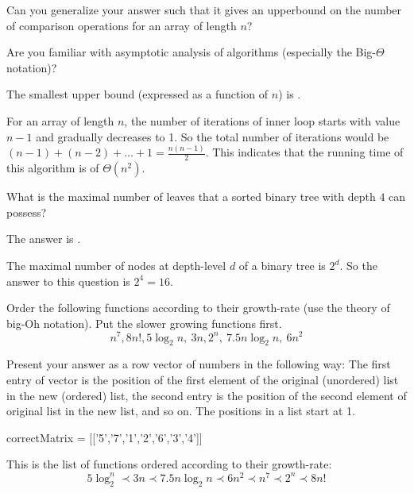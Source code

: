 \documentclass{ximera}
\begin{document}
\begin{question}
Can you generalize your answer such that it gives an upperbound on the
number of comparison operations for an array of length $n$?
\begin{solution}
\begin{hint}
Are you familiar with asymptotic analysis of algorithms (especially
the Big-$\Theta$ notation)?
\end{hint}
The smallest upper bound (expressed as a function of $n$) is
.
\end{solution}
For an array of length $n$, the number of iterations of inner loop
starts with value $n-1$ and gradually decreases to 1. So the total
number of iterations would be $(n-1) + (n-2) + \ldots + 1 =
\frac{n(n-1)}{2}$. This indicates that the running time of this
algorithm is of $\Theta(n^2)$.
\end{question}

\begin{question}
What is the maximal number of leaves that a sorted binary tree with depth $4$ can possess?
\begin{solution}
The answer is .
\end{solution}
The maximal number of nodes at depth-level $d$ of a binary tree is $2^d$. So the answer to this question is $2^4 = 16$. 
\end{question}

\begin{question}
Order the following functions according to their growth-rate (use the theory of big-Oh notation). Put the slower growing functions first.
\[
n^7, 8n!, 5 \log_2 n,~ 3n, 2^n, ~ 7.5 n\log_2 n, ~ 6 n^2
\]
\begin{solution}
Present your answer as a row vector of numbers in the following way: The first entry of vector is the position of the first element of the original (unordered) list in the new (ordered) list, the second entry is the position of the second element of original list in the new list, and so on. The positions in a list start at 1.

\begin{matrix-answer}[name=M]
     correctMatrix = [['5','7','1','2','6','3','4']]
\end{matrix-answer}
\end{solution}

This is the list of functions ordered according to their growth-rate:
\begin{equation*}
5 \log_2^n \prec 3n \prec 7.5 n \log_2{n} \prec 6n^2 \prec n^7 \prec 2^n \prec 8n!
\end{equation*}
\end{question}
\end{document}
